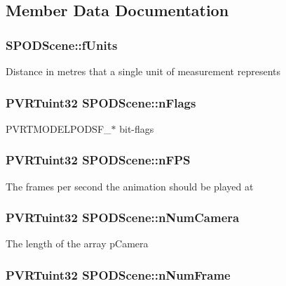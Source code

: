 \subsection{Member Data Documentation}
\hypertarget{struct_s_p_o_d_scene_a56ec6b8edeed418236ba15b41e63d71b}{
\subsubsection[{f\+Units}]{ S\+P\+O\+D\+Scene\+::f\+Units}}\label{struct_s_p_o_d_scene_a56ec6b8edeed418236ba15b41e63d71b}
Distance in metres that a single unit of measurement represents \hypertarget{struct_s_p_o_d_scene_a03f26ef383e3f0801654e7b0f2a43e1e}{
\subsubsection[{n\+Flags}]{\setlength{\rightskip}{0pt plus 5cm}P\+V\+R\+Tuint32 S\+P\+O\+D\+Scene\+::n\+Flags}}\label{struct_s_p_o_d_scene_a03f26ef383e3f0801654e7b0f2a43e1e}
P\+V\+R\+T\+M\+O\+D\+E\+L\+P\+O\+D\+S\+F\+\_\+$\ast$ bit-\/flags \hypertarget{struct_s_p_o_d_scene_a73079ccb12e0b52f28111f31390ec712}{
\subsubsection[{n\+F\+P\+S}]{\setlength{\rightskip}{0pt plus 5cm}P\+V\+R\+Tuint32 S\+P\+O\+D\+Scene\+::n\+F\+P\+S}}\label{struct_s_p_o_d_scene_a73079ccb12e0b52f28111f31390ec712}
The frames per second the animation should be played at \hypertarget{struct_s_p_o_d_scene_a05ca43d0015cfbc54c8b08e3fc841de7}{
\subsubsection[{n\+Num\+Camera}]{\setlength{\rightskip}{0pt plus 5cm}P\+V\+R\+Tuint32 S\+P\+O\+D\+Scene\+::n\+Num\+Camera}}\label{struct_s_p_o_d_scene_a05ca43d0015cfbc54c8b08e3fc841de7}
The length of the array p\+Camera \hypertarget{struct_s_p_o_d_scene_ac6ef16956132f29da416a71397a2e98b}{
\subsubsection[{n\+Num\+Frame}]{\setlength{\rightskip}{0pt plus 5cm}P\+V\+R\+Tuint32 S\+P\+O\+D\+Scene\+::n\+Num\+Frame}}\label{struct_s_p_o_d_scene_ac6ef16956132f29da416a71397a2e98b}
